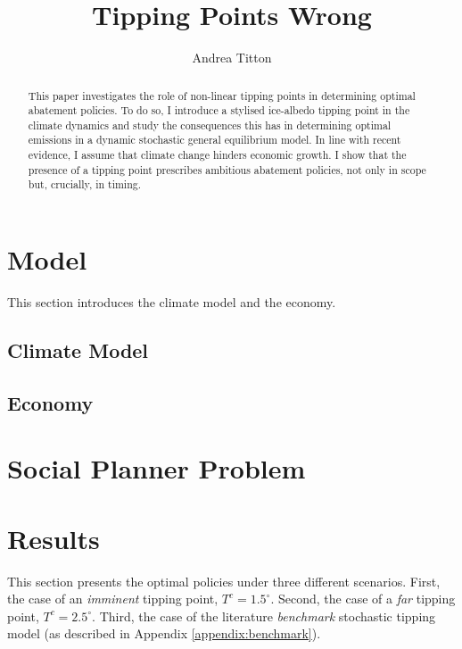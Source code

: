 \documentclass[12pt]{article}
\author{Andrea Titton}
\title{Tipping Points Wrong}
\begin{document}
\maketitle

\begin{abstract}
  This paper investigates the role of non-linear tipping points in determining optimal abatement policies. To do so, I introduce a stylised ice-albedo tipping point in the climate dynamics and study the consequences this has in determining optimal emissions in a dynamic stochastic general equilibrium model. In line with recent evidence, I assume that climate change hinders economic growth. I show that the presence of a tipping point prescribes ambitious abatement policies, not only in scope but, crucially, in timing.
\end{abstract}

\newpage


\section{Model}

This section introduces the climate model and the economy.

\subsection{Climate Model}



\subsection{Economy}




\section{Social Planner Problem}



\section{Results}

This section presents the optimal policies under three different scenarios. First, the case of an \textit{imminent} tipping point, $T^c = 1.5^{\circ}$. Second, the case of a \textit{far} tipping point, $T^c = 2.5^{\circ}$. Third, the case of the literature \textit{benchmark} stochastic tipping model (as described in Appendix \ref{appendix:benchmark}).
\end{document}
